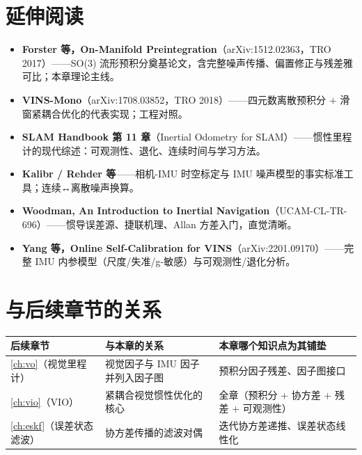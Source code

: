 \section*{延伸阅读}
\begin{itemize}
  \item \textbf{Forster 等，On-Manifold Preintegration}（arXiv:1512.02363，TRO 2017）\cite{forster2017preintegration}——SO(3) 流形预积分奠基论文，含完整噪声传播、偏置修正与残差雅可比；本章理论主线。
  \item \textbf{VINS-Mono}（arXiv:1708.03852，TRO 2018）\cite{qin2018vins}——四元数离散预积分 $+$ 滑窗紧耦合优化的代表实现；工程对照。
  \item \textbf{SLAM Handbook 第 11 章}（Inertial Odometry for SLAM）\cite{carlone2026handbook}——惯性里程计的现代综述：可观测性、退化、连续时间与学习方法。
  \item \textbf{Kalibr / Rehder 等}\cite{rehder2016kalibr}——相机-IMU 时空标定与 IMU 噪声模型的事实标准工具；连续↔离散噪声换算。
  \item \textbf{Woodman, An Introduction to Inertial Navigation}（UCAM-CL-TR-696）\cite{woodman2007inertial}——惯导误差源、捷联机理、Allan 方差入门，直觉清晰。
  \item \textbf{Yang 等，Online Self-Calibration for VINS}（arXiv:2201.09170）\cite{yang2022online}——完整 IMU 内参模型（尺度/失准/g-敏感）与可观测性/退化分析。
\end{itemize}

\section*{与后续章节的关系}
\begin{table}[H]\centering\small
\begin{tabular}{lll}
\toprule
后续章节 & 与本章的关系 & 本章哪个知识点为其铺垫 \\
\midrule
\cref{ch:vo}（视觉里程计）& 视觉因子与 IMU 因子并列入因子图 & 预积分因子残差、因子图接口 \\
\cref{ch:vio}（VIO）& 紧耦合视觉惯性优化的核心 & 全章（预积分 + 协方差 + 残差 + 可观测性） \\
\cref{ch:eskf}（误差状态滤波）& 协方差传播的滤波对偶 & 迭代协方差递推、误差状态线性化 \\
\bottomrule
\end{tabular}
\end{table}

